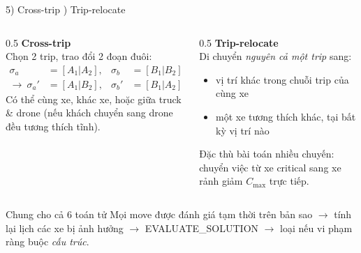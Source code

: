 \documentclass[aspectratio=169]{beamer}
\begin{document}
\begin{frame}{5) Cross-trip ) Trip-relocate}
  \begin{columns}[T]
    \begin{column}{0.5\textwidth}
      \textbf{Cross-trip}\\
      \small Chọn 2 trip, trao đổi 2 đoạn đuôi:
      \begin{align*}
        \sigma_a &= [A_1|A_2], & \sigma_b &= [B_1|B_2] \\
        \to\ \sigma_a' &= [A_1|B_2], & \sigma_b' &= [B_1|A_2]
      \end{align*}
      \small Có thể cùng xe, khác xe, hoặc giữa truck \& drone (nếu khách chuyển sang drone đều tương thích tĩnh).
    \end{column}
    \begin{column}{0.5\textwidth}
      \textbf{Trip-relocate}\\
      \small Di chuyển \emph{nguyên cả một trip} sang:
      \begin{itemize}
        \item \small vị trí khác trong chuỗi trip của cùng xe
        \item \small một xe tương thích khác, tại bất kỳ vị trí nào
      \end{itemize}
      \small Đặc thù bài toán nhiều chuyến: chuyển việc từ xe critical sang xe rảnh giảm $C_{\max}$ trực tiếp.
    \end{column}
  \end{columns}
  \vspace{3mm}
  \begin{alertblock}{Chung cho cả 6 toán tử}
    Mọi move được đánh giá tạm thời trên bản sao $\to$ tính lại lịch các xe bị ảnh hưởng $\to$ EVALUATE\_SOLUTION $\to$ loại nếu vi phạm ràng buộc \emph{cấu trúc}.
  \end{alertblock}
\end{frame}
\end{document}
